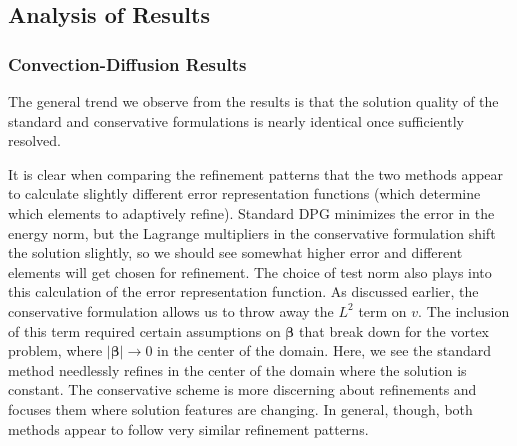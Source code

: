 \documentclass[letterpaper]{article}
\def\bbeta{\boldsymbol\beta}
\newcommand{\snorm}[1]{\left| #1 \right|}
\begin{document}
\subsection{Analysis of Results}\label{sec:problemAnalysis}
\subsubsection{Convection-Diffusion Results}
The general trend we observe from the results is that the solution quality
of the standard and conservative formulations is nearly identical once
sufficiently resolved.


It is clear when comparing the refinement patterns that the two methods appear
to calculate slightly different error representation functions (which
determine which elements to adaptively refine). Standard DPG minimizes the
error in the energy norm, but the Lagrange multipliers in the conservative
formulation shift the solution slightly, so we should see somewhat higher
error and different elements will get chosen for refinement. The choice of
test norm also plays into this calculation of the error representation
function. As discussed earlier, the conservative formulation allows us to
throw away the $L^2$ term on $v$. The inclusion of this term required certain
assumptions on $\bbeta$ \cite{ChanHeuerThanhDemkowicz2012} that break down for
the vortex problem, where $\snorm{\bbeta}\rightarrow 0$ in the center of the domain. 
Here, we see the standard method needlessly refines
in the center of the domain where the solution is constant. The conservative
scheme is more discerning about refinements and focuses them where
solution features are changing. In general, though, both methods appear to
follow very similar refinement patterns.
\end{document}
